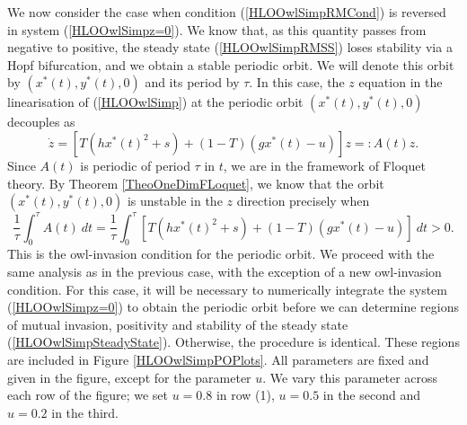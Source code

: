 \documentclass[12pt]{UOthesis}
\theoremstyle{remarkstyle}
\begin{document}
We now consider the case when condition (\ref{HLOOwlSimpRMCond}) is reversed in system (\ref{HLOOwlSimpz=0}). We know that, as this quantity passes from negative to positive, the steady state (\ref{HLOOwlSimpRMSS}) loses stability via a Hopf bifurcation, and we obtain a stable periodic orbit. We will denote this orbit by $(x^*(t),y^*(t),0)$ and its period by $\tau$. In this case, the $z$ equation in the linearisation of (\ref{HLOOwlSimp}) at the periodic orbit $(x^*(t),y^*(t),0)$ decouples as
$$\dot{z}=\left[T\left(hx^*(t)^2+s\right)+(1-T)(gx^*(t)-u)\right]z=\colon A(t)z.$$
Since $A(t)$ is periodic of period $\tau$ in $t$, we are in the framework of Floquet theory. By Theorem \ref{TheoOneDimFLoquet}, we know that the orbit $(x^*(t),y^*(t),0)$ is unstable in the $z$ direction precisely when
\begin{equation}
	\frac{1}{\tau}\int_0^\tau A(t)\ dt=\frac{1}{\tau}\int_0^\tau \left[T\left(hx^*(t)^2+s\right)+(1-T)(gx^*(t)-u)\right]\ dt>0.
	\label{HLOOwlSimpOwlPOInvCond}
\end{equation}
This is the owl-invasion condition for the periodic orbit. We proceed with the same analysis as in the previous case, with the exception of a new owl-invasion condition. For this case, it will be necessary to numerically integrate the system (\ref{HLOOwlSimpz=0}) to obtain the periodic orbit before we can determine regions of mutual invasion, positivity and stability of the steady state (\ref{HLOOwlSimpSteadyState}). Otherwise, the procedure is identical. These regions are included in Figure \ref{HLOOwlSimpPOPlots}. All parameters are fixed and given in the figure, except for the parameter $u$. We vary this parameter across each row of the figure; we set $u=0.8$ in row (1), $u=0.5$ in the second and $u=0.2$ in the third.\\
\end{document}
